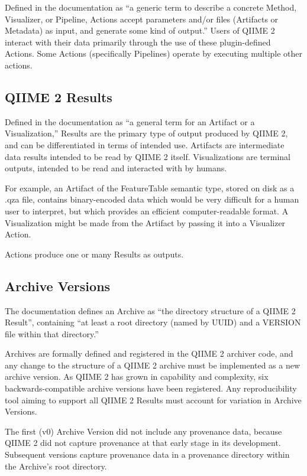Defined in the documentation as “a generic term to describe a concrete Method,
Visualizer, or Pipeline, Actions accept parameters and/or files (Artifacts or
Metadata) as input, and generate some kind of output.” Users of QIIME 2 interact
with their data primarily through the use of these plugin-defined Actions. Some
Actions (specifically Pipelines) operate by executing multiple other actions.

\subsection{QIIME 2 Results}

Defined in the documentation as “a general term for an Artifact or a
Visualization,” Results are the primary type of output produced by QIIME 2, and
can be differentiated in terms of intended use. Artifacts are intermediate data
results intended to be read by QIIME 2 itself. Visualizations are terminal
outputs, intended to be read and interacted with by humans. 

For example, an Artifact of the FeatureTable semantic type, stored on disk as a
.qza file, contains binary-encoded data which would be very difficult for a
human user to interpret, but which provides an efficient computer-readable
format. A Visualization might be made from the Artifact by passing it into a
Visualizer Action.

Actions produce one or many Results as outputs.

\subsection{Archive Versions}

The documentation defines an Archive as “the directory structure of a QIIME 2
Result”, containing “at least a root directory (named by UUID) and a VERSION
file within that directory.” 

Archives are formally defined and registered in the QIIME 2 archiver code, and
any change to the structure of a QIIME 2 archive must be implemented as a new
archive version. As QIIME 2 has grown in capability and complexity, six
backwards-compatible archive versions have been registered. Any reproducibility
tool aiming to support all QIIME 2 Results must account for variation in Archive
Versions.

The first (v0) Archive Version did not include any provenance data, because
QIIME 2 did not capture provenance at that early stage in its development.
Subsequent versions capture provenance data in a provenance directory within the
Archive’s root directory.

